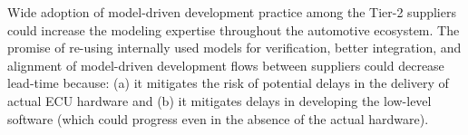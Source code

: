 
Wide adoption of model-driven development practice among the Tier-2 suppliers could increase the modeling expertise throughout the automotive ecosystem.
The promise of re-using internally used models for verification, better integration, and alignment of model-driven development flows between
suppliers could decrease lead-time because:
(a) it mitigates the risk of potential delays in the delivery of actual ECU hardware and 
(b) it mitigates delays in developing the low-level software (which could progress even in the absence of the actual hardware).
